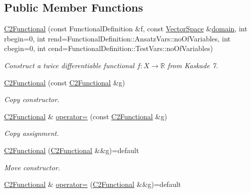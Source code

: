 \subsection*{Public Member Functions}
\begin{DoxyCompactItemize}
\item 
\hyperlink{classSpacy_1_1Kaskade_1_1C2Functional_a35511ed1de0b2599efa901f27793dbdc}{C2\+Functional} (const Functional\+Definition \&f, const \hyperlink{classSpacy_1_1VectorSpace}{Vector\+Space} \&\hyperlink{classSpacy_1_1FunctionalBase_a2d3397deb9fa1ad85ed04e37a03b3aa6}{domain}, int rbegin=0, int rend=Functional\+Definition\+::\+Ansatz\+Vars\+::no\+Of\+Variables, int cbegin=0, int cend=Functional\+Definition\+::\+Test\+Vars\+::no\+Of\+Variables)
\begin{DoxyCompactList}\small\item\em Construct a twice differentiable functional $f: X\rightarrow \mathbb{R}$ from Kaskade 7. \end{DoxyCompactList}\item 
\hyperlink{classSpacy_1_1Kaskade_1_1C2Functional_a3d4246d31cffe9ea79cca4ab7c539ede}{C2\+Functional} (const \hyperlink{classSpacy_1_1Kaskade_1_1C2Functional}{C2\+Functional} \&g)
\begin{DoxyCompactList}\small\item\em Copy constructor. \end{DoxyCompactList}\item 
\hyperlink{classSpacy_1_1Kaskade_1_1C2Functional}{C2\+Functional} \& \hyperlink{classSpacy_1_1Kaskade_1_1C2Functional_a1e24c0959890ba4caf0531cf47f3bee5}{operator=} (const \hyperlink{classSpacy_1_1Kaskade_1_1C2Functional}{C2\+Functional} \&g)
\begin{DoxyCompactList}\small\item\em Copy assignment. \end{DoxyCompactList}\item 
\hyperlink{classSpacy_1_1Kaskade_1_1C2Functional_adf3cb62771e39a351db349005ec6bc36}{C2\+Functional} (\hyperlink{classSpacy_1_1Kaskade_1_1C2Functional}{C2\+Functional} \&\&g)=default
\begin{DoxyCompactList}\small\item\em Move constructor. \end{DoxyCompactList}\item 
\hyperlink{classSpacy_1_1Kaskade_1_1C2Functional}{C2\+Functional} \& \hyperlink{classSpacy_1_1Kaskade_1_1C2Functional_a2cabb743e80fa24c22ef0ac358159323}{operator=} (\hyperlink{classSpacy_1_1Kaskade_1_1C2Functional}{C2\+Functional} \&\&g)=default

\end{DoxyCompactItemize}
